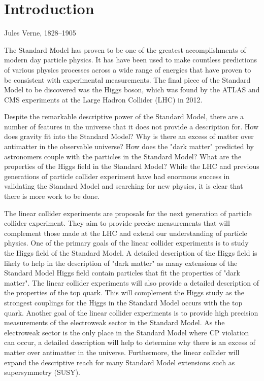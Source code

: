 \chapter{Introduction}
\label{chap:introduction}

{Jules Verne, 1828--1905}


The Standard Model has proven to be one of the greatest accomplishments of modern day particle physics.  It has have been used to make countless predictions of various physics processes across a wide range of energies that have proven to be consistent with experimental measurements.  The final piece of the Standard Model to be discovered was the Higgs boson, which was found by the ATLAS \cite{Aad:2012tfa} and CMS \cite{Chatrchyan:2012xdj} experiments at the Large Hadron Collider (LHC) in 2012.  

Despite the remarkable descriptive power of the Standard Model, there are a number of features in the universe that it does not provide a description for.  How does gravity fit into the Standard Model?  Why is there an excess of matter over antimatter in the observable universe?  How does the "dark matter" predicted by astronomers couple with the particles in the Standard Model?  What are the properties of the Higgs field in the Standard Model?  While the LHC and previous generations of particle collider experiment have had enormous success in validating the Standard Model and searching for new physics, it is clear that there is more work to be done. 

The linear collider experiments are proposals for the next generation of particle collider experiment.  They aim to provide precise measurements that will complement those made at the LHC and extend our understanding of particle physics.  One of the primary goals of the linear collider experiments is to study the Higgs field of the Standard Model.  A detailed description of the Higgs field is likely to help in the description of "dark matter" as many extensions of the Standard Model Higgs field contain particles that fit the properties of "dark matter".  The linear collider experiments will also provide a detailed description of the properties of the top quark.  This will complement the Higgs study as the strongest couplings for the Higgs in the Standard Model occurs with the top quark.  Another goal of the linear collider experiments is to provide high precision measurements of the electroweak sector in the Standard Model.  As the electroweak sector is the only place in the Standard Model where CP violation can occur, a detailed description will help to determine why there is an excess of matter over antimatter in the universe.  Furthermore, the linear collider will expand the descriptive reach for many Standard Model extensions such as supersymmetry (SUSY).

